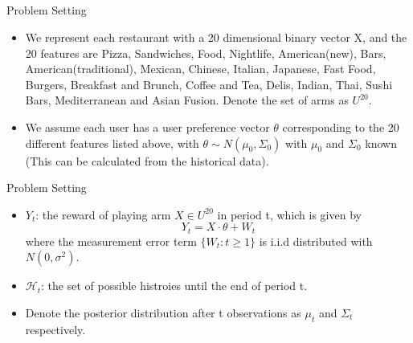 \documentclass[serif]{beamer}
\begin{document}
\tableofcontents[currentsection,subsectionstyle=hide]

\subsection*{}

\begin{frame}{Problem Setting}
\begin{itemize}
\item<1-> We represent each restaurant with a 20 dimensional binary vector X, and the 20 features are Pizza, Sandwiches, Food, Nightlife, American(new), Bars, American(traditional), Mexican, Chinese, Italian, Japanese, Fast Food, Burgers, Breakfast and Brunch, Coffee and Tea, Delis, Indian, Thai, Sushi Bars, Mediterranean and Asian Fusion. Denote the set of arms as $U^{20}$.
\item<2-> We assume each user has a user preference vector $\theta$ corresponding to the 20 different features listed above, with $\theta\sim N(\mu_{0},\Sigma_{0})$ with $\mu_{0}$ and $\Sigma_{0}$ known (This can be calculated from the historical data).
\end{itemize}
\end{frame}
\begin{frame}{Problem Setting}
\begin{itemize}
\item<1-> $Y_{t}$: the reward of playing arm $X\in U^{20}$ in period t, which is given by
\begin{equation}
Y_{t}=X\cdot \theta+W_{t} \nonumber 
\end{equation}
where the measurement error term $\{W_{t}:t\geq 1\}$ is i.i.d distributed with $N(0,\sigma^{2})$.
\item<2-> $\mathscr{H}_{t}$: the set of possible histroies until the end of period t.
\item Denote the posterior distribution after t observations as $\mu_{t}$ and $\Sigma_{t}$ respectively.
\end{itemize}
\end{frame}
\end{document}
